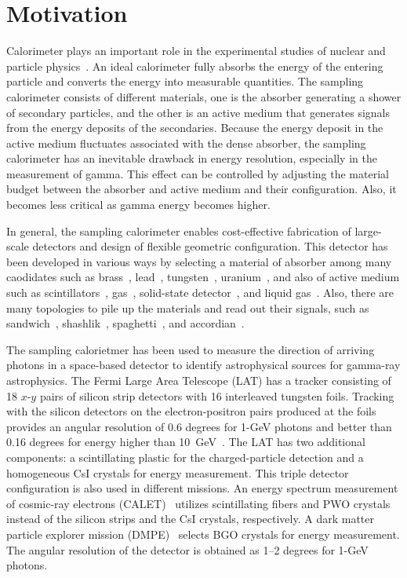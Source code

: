 \documentclass[12pt,times,draftclsnofoot,a4paper]{elsarticle}
\begin{document}
\linenumbers

\section{Motivation}
\label{sec:mot}

Calorimeter plays an important role in the experimental studies of nuclear and particle physics~\cite{unitext}. An ideal calorimeter fully absorbs the energy of the entering particle and converts the energy into measurable quantities. The sampling calorimeter consists of different materials, one is the absorber generating a shower of secondary particles, and the other is an active medium that generates signals from the energy deposits of the secondaries. Because the energy deposit in the active medium fluctuates associated with the dense absorber, the sampling calorimeter has an inevitable drawback in energy resolution, especially in the measurement of gamma. This effect can be controlled by adjusting the material budget between the absorber and active medium and their configuration. Also, it becomes less critical as gamma energy becomes higher.

In general, the sampling calorimeter enables cost-effective fabrication of large-scale detectors and design of flexible geometric configuration. This detector has been developed in various ways by selecting a material of absorber among many caodidates such as brass~\cite{CMS:mat}, lead~\cite{CDF:mat}, tungsten~\cite{DELPHI:mat}, uranium~\cite{UGAS:mat}, and also of active medium such as scintillators~\cite{CMS:mat,CDF:mat}, gas~\cite{UGAS:mat}, solid-state detector~\cite{DELPHI:mat}, and liquid gas~\cite{LiqAR:mat}. Also, there are many topologies to pile up the materials and read out their signals, such as sandwich~\cite{KOTO:MB}, shashlik~\cite{shashlik:con}, spaghetti~\cite{KLOE:con}, and accordian~\cite{LiqAR:mat}.

The sampling calorietmer has been used to measure the direction of arriving photons in a space-based detector to identify astrophysical sources for gamma-ray astrophysics. The Fermi Large Area Telescope (LAT) has a tracker consisting of 18 $x$-$y$ pairs of silicon strip detectors with 16 interleaved tungsten foils. Tracking with the silicon detectors on the electron-positron pairs produced at the foils provides an angular resolution of 0.6 degrees for 1-GeV photons and better than 0.16 degrees for energy higher than 10~GeV~\cite{FERMI:LAT}. The LAT has two additional components: a scintillating plastic for the charged-particle detection and a homogeneous CsI crystals for energy measurement. This triple detector configuration is also used in different missions. An energy spectrum measurement of cosmic-ray electrons (CALET)~\cite{CALET} utilizes scintillating fibers and PWO crystals instead of the silicon strips and the CsI crystals, respectively. A dark matter particle explorer mission (DMPE)~\cite{DMPE} selects BGO crystals for energy measurement. The angular resolution of the detector is obtained as 1--2 degrees for 1-GeV photons.
\end{document}
